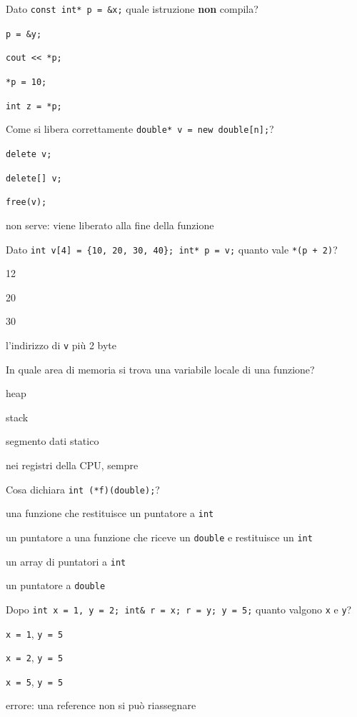 \begin{quiz}{Dato \texttt{const int* p = \&x;} quale istruzione \textbf{non} compila?}
  \item \texttt{p = \&y;}
  \item \texttt{cout << *p;}
  \item \texttt{*p = 10;}
  \item \texttt{int z = *p;}
\end{quiz}

\begin{quiz}{Come si libera correttamente \texttt{double* v = new double[n];}?}
  \item \texttt{delete v;}
  \item \texttt{delete[] v;}
  \item \texttt{free(v);}
  \item non serve: viene liberato alla fine della funzione
\end{quiz}

\begin{quiz}{Dato \texttt{int v[4] = \{10, 20, 30, 40\}; int* p = v;} quanto vale \texttt{*(p + 2)}?}
  \item 12
  \item 20
  \item 30
  \item l'indirizzo di \texttt{v} più 2 byte
\end{quiz}

\begin{quiz}{In quale area di memoria si trova una variabile locale di una funzione?}
  \item heap
  \item stack
  \item segmento dati statico
  \item nei registri della CPU, sempre
\end{quiz}

\begin{quiz}{Cosa dichiara \texttt{int (*f)(double);}?}
  \item una funzione che restituisce un puntatore a \texttt{int}
  \item un puntatore a una funzione che riceve un \texttt{double} e restituisce un \texttt{int}
  \item un array di puntatori a \texttt{int}
  \item un puntatore a \texttt{double}
\end{quiz}

\begin{quiz}{Dopo \texttt{int x = 1, y = 2; int\& r = x; r = y; y = 5;} quanto valgono \texttt{x} e \texttt{y}?}
  \item \texttt{x = 1}, \texttt{y = 5}
  \item \texttt{x = 2}, \texttt{y = 5}
  \item \texttt{x = 5}, \texttt{y = 5}
  \item errore: una reference non si può riassegnare
\end{quiz}

